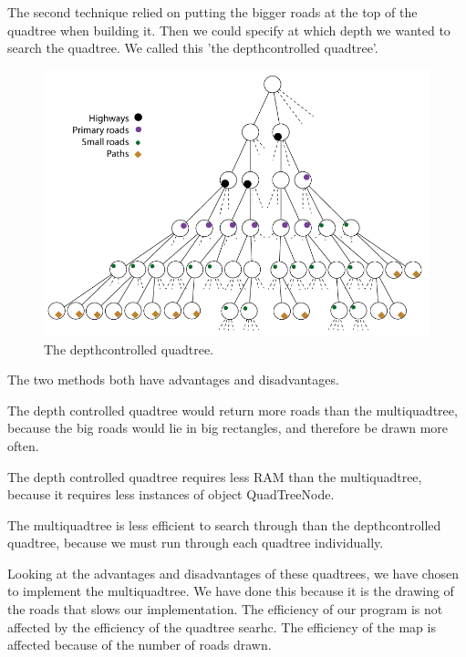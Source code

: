 The second technique relied on putting the bigger roads at the top of the
quadtree when building it. Then we could specify at which depth we wanted to
search the quadtree. We called this 'the depthcontrolled quadtree'.

\begin{figure}[h!]
\centering
\includegraphics[width=1\linewidth]{images/DepthcontrolledQuadtree.png}
\caption{The depthcontrolled quadtree.}
\label{IMPL-DCQ}
\end{figure}

The two methods both have advantages and disadvantages.

The depth controlled quadtree would return more roads than the multiquadtree,
because the big roads would lie in big rectangles, and therefore be drawn more
often.

The depth controlled quadtree requires less RAM than the multiquadtree,
because it requires less instances of object QuadTreeNode.

The multiquadtree is less efficient to search through than the
depthcontrolled quadtree, because we must run through each quadtree
individually.

Looking at the advantages and disadvantages of these quadtrees, we have chosen
to implement the multiquadtree. We have done this because it is the drawing of
the roads that slows our implementation. The efficiency of our program is not
affected by the efficiency of the quadtree searhc. The efficiency of the map is
affected because of the number of roads drawn.

